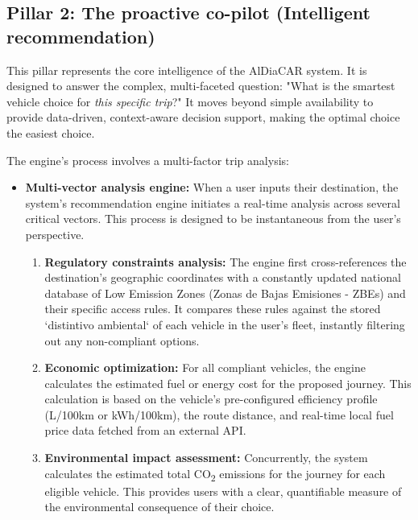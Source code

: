 \subsection{Pillar 2: The proactive co-pilot (Intelligent recommendation)}

This pillar represents the core intelligence of the AlDiaCAR system. It is designed to answer the complex, multi-faceted question: "What is the smartest vehicle choice for \textit{this specific trip}?" It moves beyond simple availability to provide data-driven, context-aware decision support, making the optimal choice the easiest choice.

\textgap

The engine's process involves a multi-factor trip analysis:
\begin{itemize}
    \item \textbf{Multi-vector analysis engine:} When a user inputs their destination, the system's recommendation engine initiates a real-time analysis across several critical vectors. This process is designed to be instantaneous from the user's perspective.
    
    \textgap
    
    \begin{enumerate}
        \item \textbf{Regulatory constraints analysis:} The engine first cross-references the destination's geographic coordinates with a constantly updated national database of Low Emission Zones (Zonas de Bajas Emisiones - ZBEs) and their specific access rules. It compares these rules against the stored `distintivo ambiental` of each vehicle in the user's fleet, instantly filtering out any non-compliant options.
        
        \textgap
        
        \item \textbf{Economic optimization:} For all compliant vehicles, the engine calculates the estimated fuel or energy cost for the proposed journey. This calculation is based on the vehicle's pre-configured efficiency profile (L/100km or kWh/100km), the route distance, and real-time local fuel price data fetched from an external API.
        
        \textgap
        
        \item \textbf{Environmental impact assessment:} Concurrently, the system calculates the estimated total CO\textsubscript{2} emissions for the journey for each eligible vehicle. This provides users with a clear, quantifiable measure of the environmental consequence of their choice.
        

\end{enumerate}
\end{itemize}
